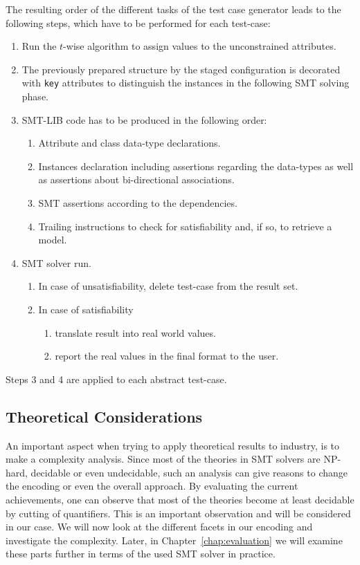 The resulting order of the different tasks of the test case generator leads to the following steps, which have to be performed for each test-case:
\begin{enumerate}
 \item Run the $t$-wise algorithm to assign values to the unconstrained attributes.
 \item The previously prepared structure by the staged configuration is decorated with \verb|key| attributes to distinguish the instances in the following SMT solving phase.
 \item SMT-LIB code has to be produced in the following order:
  \begin{enumerate}
   \item Attribute and class data-type declarations.
   \item Instances declaration including assertions regarding the data-types as well as assertions about bi-directional associations.
   \item SMT assertions according to the dependencies.
   \item Trailing instructions to check for satisfiability and, if so, to retrieve a model.
  \end{enumerate}
 \item SMT solver run. 
 	\begin{enumerate}
 	 \item In case of unsatisfiability, delete test-case from the result set.
 	 \item In case of satisfiability
 	 \begin{enumerate}
 	  \item translate result into real world values.
 	  \item report the real values in the final format to the user.
 	 \end{enumerate}
 	\end{enumerate}
\end{enumerate}

Steps 3 and 4 are applied to each abstract test-case.

\subsection{Theoretical Considerations}\label{subsec:theor-eval}

An important aspect when trying to apply theoretical results to industry, is to make a complexity analysis. Since most of the theories in SMT solvers are NP-hard, decidable or even undecidable, such an analysis can give reasons to change the encoding or even the overall approach. By evaluating the current achievements, one can observe that most of the theories become at least decidable by cutting of quantifiers. This is an important observation and will be considered in our case.
We will now look at the different facets in our encoding and investigate the complexity. Later, in Chapter~\ref{chap:evaluation} we will examine these parts further in terms of the used SMT solver in practice.



